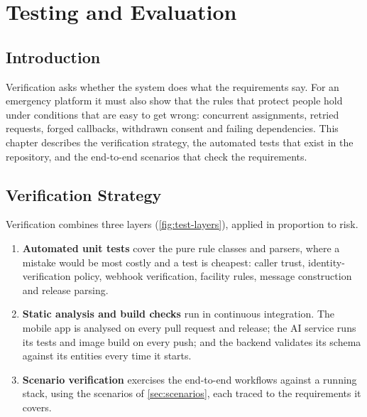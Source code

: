 \chapter{Testing and Evaluation}\label{chap:testing}

\section{Introduction}

Verification asks whether the system does what the requirements say. For an emergency platform it must also show that the
rules that protect people hold under conditions that are easy to get wrong: concurrent assignments, retried requests,
forged callbacks, withdrawn consent and failing dependencies. This chapter describes the verification strategy, the
automated tests that exist in the repository, and the end-to-end scenarios that check the requirements.

\section{Verification Strategy}

Verification combines three layers (\cref{fig:test-layers}), applied in proportion to risk.

\begin{enumerate}
  \item \textbf{Automated unit tests} cover the pure rule classes and parsers, where a mistake would be most costly and
        a test is cheapest: caller trust, identity-verification policy, webhook verification, facility rules, message
        construction and release parsing.
  \item \textbf{Static analysis and build checks} run in continuous integration. The mobile app is analysed on every pull
        request and release; the AI service runs its tests and image build on every push; and the backend validates its
        schema against its entities every time it starts.
  \item \textbf{Scenario verification} exercises the end-to-end workflows against a running stack, using the scenarios of
        \cref{sec:scenarios}, each traced to the requirements it covers.
\end{enumerate}

